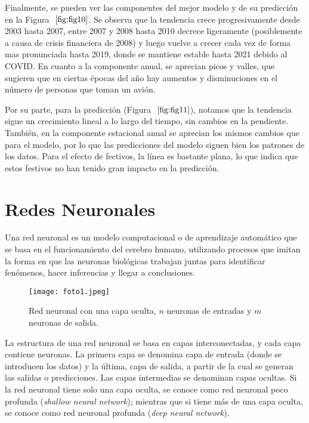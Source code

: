 \documentclass[12pt,twoside]{article}
\begin{document}
Finalmente, se pueden ver las componentes del mejor modelo y de su predicción en la Figura $~\ref{fig:fig10}$. Se observa que la tendencia crece progresivamente desde 2003 hasta 2007, entre 2007 y 2008 hasta 2010 decrece ligeramente (posiblemente a causa de crisis financiera de 2008) y luego vuelve a crecer cada vez de forma mas pronunciada hasta 2019, donde se mantiene estable hasta 2021 debido al COVID. En cuanto a la componente anual, se aprecian picos y valles, que sugieren que en ciertas épocas del año hay aumentos y disminuciones en el número de personas que toman un avión.

Por su parte, para la predicción (Figura $~\ref{fig:fig11}$), notamos que la tendencia sigue un crecimiento lineal a lo largo del tiempo, sin cambios en la pendiente. También, en la componente estacional anual se aprecian los mismos cambios que para el modelo, por lo que las predicciones del modelo siguen bien los patrones de los datos. Para el efecto de fectivos, la línea es bastante plana, lo que indica que estos festivos no han tenido gran impacto en la predicción.

\newpage


\section{Redes Neuronales}\label{sec:10}

Una red neuronal \cite{redes1} es un modelo computacional o de aprendizaje automático que se basa en el funcionamiento del cerebro humano, utilizando procesos que imitan la forma en que las neuronas biológicas trabajan juntas para identificar fenómenos, hacer inferencias y llegar a conclusiones.

\begin{figure}[h]
    \centering
    \texttt{[image: foto1.jpeg]}
    \caption{Red neuronal con una capa oculta, $n$ neuronas de entradas y $m$ neuronas de salida.} 
    \label{fig:fig12}
\end{figure}

La estructura de una red neuronal \cite{redes4} se basa en capas interconectadas, y cada capa contiene neuronas. La primera capa se denomina capa de entrada (donde se introducen los datos) y la última, capa de salida, a partir de la cual se generan las salidas o predicciones. Las capas intermedias se denominan capas ocultas. Si la red neuronal tiene solo una capa oculta, se conoce como red neuronal poco profunda (\textit{shallow neural network}); mientras que si tiene más de una capa oculta, se conoce como red neuronal profunda (\textit{deep neural network}).
\end{document}
